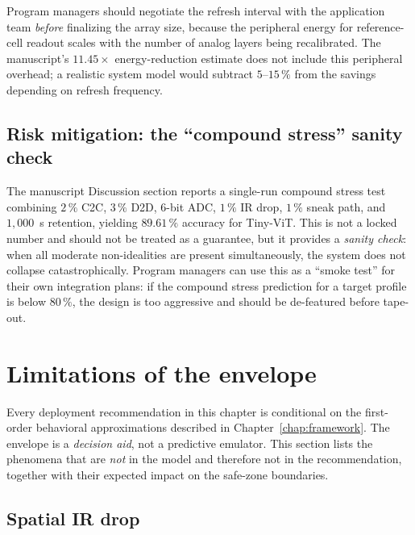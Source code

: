 Program managers should negotiate the refresh interval with the application team \emph{before} finalizing the array size, because the peripheral energy for reference-cell readout scales with the number of analog layers being recalibrated.  The manuscript's $11.45\times$ energy-reduction estimate does not include this peripheral overhead; a realistic system model would subtract $5$--$15\,\%$ from the savings depending on refresh frequency.

\subsection{Risk mitigation: the ``compound stress'' sanity check}

The manuscript Discussion section reports a single-run compound stress test combining $2\,\%$ C2C, $3\,\%$ D2D, 6-bit ADC, $1\,\%$ IR drop, $1\,\%$ sneak path, and $1{,}000$~s retention, yielding $89.61\,\%$ accuracy for Tiny-ViT.  This is not a locked number and should not be treated as a guarantee, but it provides a \emph{sanity check}: when all moderate non-idealities are present simultaneously, the system does not collapse catastrophically.  Program managers can use this as a ``smoke test'' for their own integration plans: if the compound stress prediction for a target profile is below $80\,\%$, the design is too aggressive and should be de-featured before tape-out.


\section{Limitations of the envelope}
\label{sec:envelope-limitations}

Every deployment recommendation in this chapter is conditional on the first-order behavioral approximations described in Chapter~\ref{chap:framework}.  The envelope is a \emph{decision aid}, not a predictive emulator.  This section lists the phenomena that are \emph{not} in the model and therefore not in the recommendation, together with their expected impact on the safe-zone boundaries.

\subsection{Spatial IR drop}

